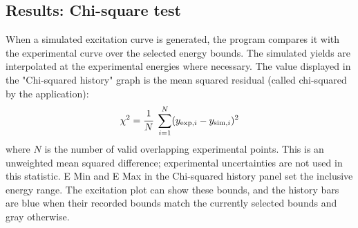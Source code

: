 \documentclass[11pt,a4paper]{article}
\begin{document}
\subsection{Results: Chi-square test}
When a simulated excitation curve is generated, the program compares it with the experimental curve over the selected energy bounds. The simulated yields are interpolated at the experimental energies where necessary. The value displayed in the "Chi-squared history" graph is the mean squared residual (called chi-squared by the application):
\begin{equation*}
\chi^2 =
\cfrac{1}{N}\ \sum\limits_{i=1}^{N} (y_{\mathrm{exp},i} - y_{\mathrm{sim},i})^2
\end{equation*}
where $N$ is the number of valid overlapping experimental points. This is an unweighted mean squared difference; experimental uncertainties are not used in this statistic. E Min and E Max in the Chi-squared history panel set the inclusive energy range. The excitation plot can show these bounds, and the history bars are blue when their recorded bounds match the currently selected bounds and gray otherwise.


\clearpage
\printbibliography[heading=bibintoc]
\end{document}
